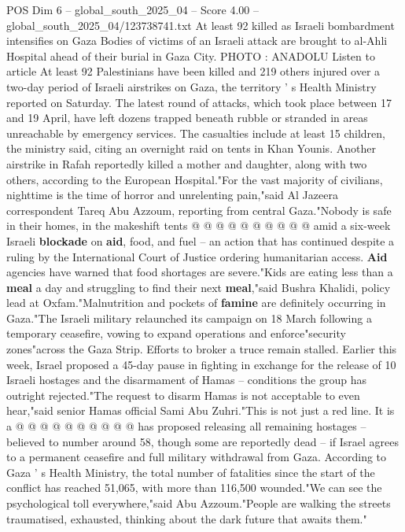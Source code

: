 \begin{textsample}{POS Dim 6 – global\_south\_2025\_04 – Score 4.00 – global\_south\_2025\_04/123738741.txt}  \label{ex:f6_pos_238}
At least 92 killed as Israeli bombardment intensifies on Gaza Bodies of victims of an Israeli attack are brought to al-Ahli Hospital ahead of their burial in Gaza City.
PHOTO : ANADOLU Listen to article At least 92 Palestinians have been killed and 219 others injured over a two-day period of Israeli airstrikes on Gaza, the territory ' s Health Ministry reported on Saturday.
The latest round of attacks, which took place between 17 and 19 April, have left dozens trapped beneath rubble or stranded in areas unreachable by emergency services.
The casualties include at least 15 children, the ministry said, citing an overnight raid on tents in Khan Younis.
Another airstrike in Rafah reportedly killed a mother and daughter, along with two others, according to the European Hospital."For the vast majority of civilians, nighttime is the time of horror and unrelenting pain,"said Al Jazeera correspondent Tareq Abu Azzoum, reporting from central Gaza."Nobody is safe in their homes, in the makeshift tents @ @ @ @ @ @ @ @ @ @ amid a six-week Israeli \textbf{blockade} on \textbf{aid}, food, and fuel -- an action that has continued despite a ruling by the International Court of Justice ordering humanitarian access. \textbf{Aid} agencies have warned that food shortages are severe."Kids are eating less than a \textbf{meal} a day and struggling to find their next \textbf{meal},"said Bushra Khalidi, policy lead at Oxfam."Malnutrition and pockets of \textbf{famine} are definitely occurring in Gaza."The Israeli military relaunched its campaign on 18 March following a temporary ceasefire, vowing to expand operations and enforce"security zones"across the Gaza Strip.
Efforts to broker a truce remain stalled.
Earlier this week, Israel proposed a 45-day pause in fighting in exchange for the release of 10 Israeli hostages and the disarmament of Hamas -- conditions the group has outright rejected."The request to disarm Hamas is not acceptable to even hear,"said senior Hamas official Sami Abu Zuhri."This is not just a red line.
It is a @ @ @ @ @ @ @ @ @ @ has proposed releasing all remaining hostages -- believed to number around 58, though some are reportedly dead -- if Israel agrees to a permanent ceasefire and full military withdrawal from Gaza.
According to Gaza ' s Health Ministry, the total number of fatalities since the start of the conflict has reached 51,065, with more than 116,500 wounded."We can see the psychological toll everywhere,"said Abu Azzoum."People are walking the streets traumatised, exhausted, thinking about the dark future that awaits them."

\end{textsample}
